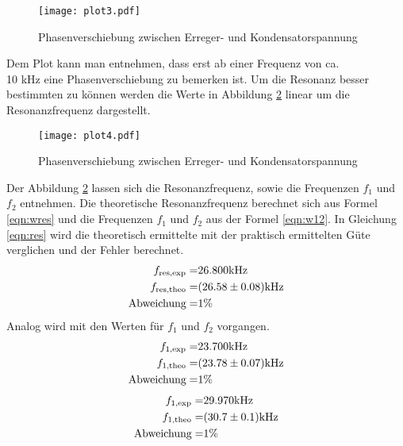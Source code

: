 \begin{figure}
  \centering
  \texttt{[image: plot3.pdf]}
  \caption{Phasenverschiebung zwischen Erreger- und Kondensatorspannung}
  \label{fig:logphi}
\end{figure}
Dem Plot kann man entnehmen, dass erst ab einer Frequenz von ca. \\
 10 kHz eine Phasenverschiebung zu bemerken ist. Um die Resonanz besser bestimmten zu können werden die Werte in Abbildung \ref{fig:Phi} linear um die Resonanzfrequenz dargestellt.
\begin{figure}
  \centering
  \texttt{[image: plot4.pdf]}
  \caption{Phasenverschiebung zwischen Erreger- und Kondensatorspannung}
  \label{fig:Phi}
\end{figure}
Der Abbildung \ref{fig:Phi} lassen sich die Resonanzfrequenz, sowie die Frequenzen $f_1$ und $f_2$ entnehmen. Die theoretische Resonanzfrequenz berechnet sich aus Formel \ref{eqn:wres} und die Frequenzen $f_1$ und $f_2$ aus der Formel \ref{eqn:w12}. In Gleichung \ref{eqn:res} wird die theoretisch ermittelte mit der praktisch ermittelten Güte verglichen und der Fehler berechnet.
\begin{eqnarray}
  f_\text{res,exp} =& 26.800 \text{kHz}			\\
  f_\text{res,theo} =& (\num{26.58 +- 0.08}) \text{kHz} \\
  \text{Abweichung} =& 1 \%
  \label{eqn:res}
\end{eqnarray}
Analog wird mit den Werten für $f_1$ und $f_2$ vorgangen.
\begin{eqnarray}
  f_\text{1,exp} =& 23.700 \text{kHz}                 \\
  f_\text{1,theo} =& (\num{23.78 +- 0.07}) \text{kHz} \\
  \text{Abweichung} =& 1 \%
\end{eqnarray}
\begin{eqnarray}
  f_\text{1,exp} =& 29.970 \text{kHz}                 \\
  f_\text{1,theo} =& (\num{30.7 +- 0.1}) \text{kHz} \\
  \text{Abweichung} =& 1 \%
\end{eqnarray}

